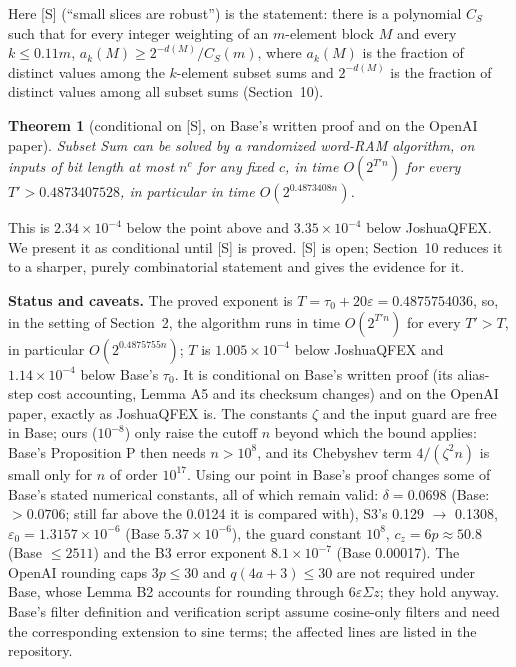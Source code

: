 \documentclass[11pt]{article}
\newcommand{\eps}{\varepsilon}
\theoremstyle{plain}
\newtheorem*{theorem*}{Theorem}
\begin{document}
Here [S] (``small slices are robust'') is the statement: there is a polynomial $C_S$ such that for every integer weighting of an $m$-element block $M$ and every $k \le 0.11m$, $a_k(M) \ge 2^{-d(M)}/C_S(m)$, where $a_k(M)$ is the fraction of distinct values among the $k$-element subset sums and $2^{-d(M)}$ is the fraction of distinct values among all subset sums (Section~10).

\begin{theorem*}[conditional on {[S]}, on Base's written proof and on the OpenAI paper]
Subset Sum can be solved by a randomized word-RAM algorithm, on inputs of bit length at most $n^c$ for any fixed $c$, in time $O(2^{T' n})$ for every $T' > 0.4873407528$, in particular in time $O(2^{0.4873408n})$.
\end{theorem*}

This is $2.34\times10^{-4}$ below the point above and $3.35\times10^{-4}$ below JoshuaQFEX. We present it as conditional until [S] is proved. [S] is open; Section~10 reduces it to a sharper, purely combinatorial statement and gives the evidence for it.

\textbf{Status and caveats.} The proved exponent is $T = \tau_0 + 20\eps = 0.4875754036$, so, in the setting of Section~2, the algorithm runs in time $O(2^{T' n})$ for every $T' > T$, in particular $O(2^{0.4875755n})$; $T$ is $1.005\times10^{-4}$ below JoshuaQFEX and $1.14\times10^{-4}$ below Base's $\tau_0$. It is conditional on Base's written proof (its alias-step cost accounting, Lemma A5 and its checksum changes) and on the OpenAI paper, exactly as JoshuaQFEX is. The constants $\zeta$ and the input guard are free in Base; ours ($10^{-8}$) only raise the cutoff $n$ beyond which the bound applies: Base's Proposition P then needs $n > 10^8$, and its Chebyshev term $4/(\zeta^2 n)$ is small only for $n$ of order $10^{17}$. Using our point in Base's proof changes some of Base's stated numerical constants, all of which remain valid: $\delta = 0.0698$ (Base: $> 0.0706$; still far above the 0.0124 it is compared with), S3's 0.129 $\to$ 0.1308, $\eps_0 = 1.3157\times10^{-6}$ (Base $5.37\times10^{-6}$), the guard constant $10^8$, $c_z = 6p \approx 50.8$ (Base $\le 2511$) and the B3 error exponent $8.1\times10^{-7}$ (Base 0.00017). The OpenAI rounding caps $3p \le 30$ and $q(4a + 3) \le 30$ are not required under Base, whose Lemma B2 accounts for rounding through $6\eps\Sigma z$; they hold anyway. Base's filter definition and verification script assume cosine-only filters and need the corresponding extension to sine terms; the affected lines are listed in the repository.
\end{document}
